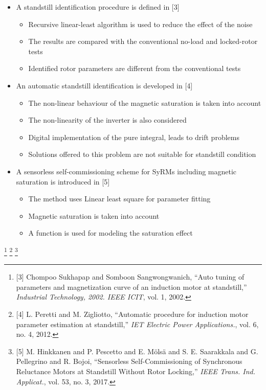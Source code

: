 \documentclass[11pt,aspectratio=169]{beamer}
\begin{document}
\begin{frame}
\begin{itemize}
    \item A standstill identification procedure is defined in [3]
    \begin{itemize}
        \item Recursive linear-least algorithm is used to reduce the effect of the noise
        \item The results are compared with the conventional no-load and locked-rotor tests
        \item Identified rotor parameters are different from the conventional tests
    \end{itemize}
    \item An automatic standstill identification is developed in [4]
\begin{itemize}
    \item The non-linear behaviour of the magnetic saturation is taken into account
    \item The non-linearity of the inverter is also considered
    \item Digital implementation of the pure integral, leads to drift problems
    \item Solutions offered to this problem are not suitable for standstill condition
\end{itemize}
    \item A sensorless self-commissioning scheme for SyRMs including magnetic saturation is introduced in [5]

\begin{itemize}
    \item The method uses Linear least square for parameter fitting 
    \item Magnetic saturation is taken into account
    \item A function is used for modeling the saturation effect
\end{itemize}

\end{itemize}
    \footnote{[3] Chompoo Sukhapap and Somboon Sangwongwanich, ``Auto tuning of parameters and magnetization curve of an induction motor at standstill,'' \emph{ Industrial Technology, 2002. IEEE ICIT}, vol. 1, 2002.}
   \footnote{[4] L. Peretti and M. Zigliotto, ``Automatic procedure for induction motor parameter estimation at standstill,'' \emph{IET Electric Power Applications.}, vol. 6, no. 4, 2012.} 
   \footnote{[5] M. Hinkkanen and P. Pescetto and E. Mölsä and S. E. Saarakkala and G. Pellegrino and R. Bojoi, ``Sensorless Self-Commissioning of Synchronous Reluctance Motors at Standstill Without Rotor Locking,'' \emph{IEEE Trans. Ind. Applicat.}, vol. 53, no. 3, 2017.}
\end{frame}
\end{document}
